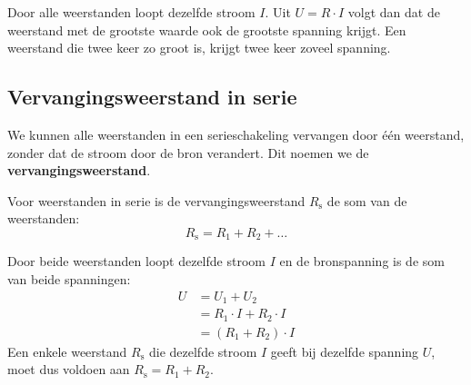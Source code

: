 \documentclass{ximera}
\begin{document}
\begin{remark}[foldable=true,title={Grootste weerstand, grootste spanning}]\nl
    Door alle weerstanden loopt dezelfde stroom $I$. Uit $U = R \cdot I$ volgt dan dat de weerstand met de grootste waarde ook de grootste spanning krijgt. Een weerstand die twee keer zo groot is, krijgt twee keer zoveel spanning.
\end{remark}

\subsection{Vervangingsweerstand in serie}
We kunnen alle weerstanden in een serieschakeling vervangen door één weerstand, zonder dat de stroom door de bron verandert. Dit noemen we de \textbf{vervangingsweerstand}.

\begin{proposition}[title={Vervangingsweerstand in serie}]\nl
    Voor weerstanden in serie is de vervangingsweerstand $R_{\text{s}}$ de som van de weerstanden:
    \begin{equation*}
        R_{\text{s}} = R_1 + R_2 + \dots
    \end{equation*}
\end{proposition}

\begin{remark}[foldable=true,title={Afleiding voor twee weerstanden}]\nl
    Door beide weerstanden loopt dezelfde stroom $I$ en de bronspanning is de som van beide spanningen:
    \begin{align*}
        U &= U_1 + U_2 \\
        &= R_1 \cdot I + R_2 \cdot I \\
        &= (R_1 + R_2) \cdot I
    \end{align*}
    Een enkele weerstand $R_{\text{s}}$ die dezelfde stroom $I$ geeft bij dezelfde spanning $U$, moet dus voldoen aan $R_{\text{s}} = R_1 + R_2$.
\end{remark}
\end{document}
